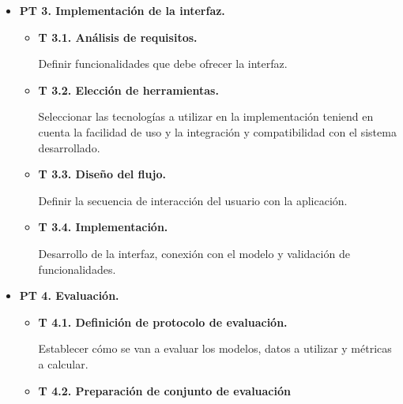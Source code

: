 \begin{itemize}
\begin{itemize}
        Estudio y elección de hiperparámetros. Integración de una configuración de estos para que se cumplan los requisitos de las dos variantes posibles del modelo planteadas a entrenar en las dos siguientes fases.
        \item \textbf{T 2.3. Entrenamiento de dos fuentes.}
        
        Entrenamiento de modelos orientados a separar una mezcla en voz y acompañamiento.
        \item \textbf{T 2.4. Entrenamiento de cuatro fuentes}
        
        Entrenamiento de modelos orientados a separar una mezcla en batería, voz, bajo y resto.
        \item \textbf{T 2.5. Organización de los resultados.}
        
        Recopilación, ordenación y preparación de los resultados generados durante los entrenamientos.
    \end{itemize}
    \item \textbf{PT 3. Implementación de la interfaz.}
    \begin{itemize}
        \item \textbf{T 3.1. Análisis de requisitos.}
        
        Definir funcionalidades que debe ofrecer la interfaz.
        \item \textbf{T 3.2. Elección de herramientas.}
        
        Seleccionar las tecnologías a utilizar en la implementación teniend en cuenta la facilidad de uso y la integración y compatibilidad con el sistema desarrollado.
        \item \textbf{T 3.3. Diseño del flujo.}
        
        Definir la secuencia de interacción del usuario con la aplicación.
        \item \textbf{T 3.4. Implementación.}
        
        Desarrollo de la interfaz, conexión con el modelo y validación de funcionalidades.
    \end{itemize}
    \item \textbf{PT 4. Evaluación.}
    \begin{itemize}
        \item \textbf{T 4.1. Definición de protocolo de evaluación.}
        
        Establecer cómo se van a evaluar los modelos, datos a utilizar y métricas a calcular.
        \item \textbf{T 4.2. Preparación de conjunto de evaluación }
        

\end{itemize}
\end{itemize}
